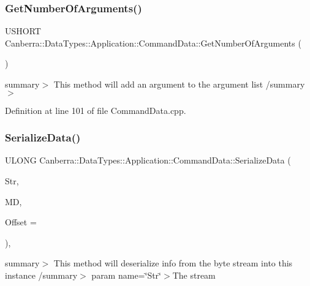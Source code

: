 \subsubsection{\texorpdfstring{Get\+Number\+Of\+Arguments()}{GetNumberOfArguments()}}
{\footnotesize\ttfamily U\+S\+H\+O\+RT Canberra\+::\+Data\+Types\+::\+Application\+::\+Command\+Data\+::\+Get\+Number\+Of\+Arguments (\begin{DoxyParamCaption}{ }\end{DoxyParamCaption})}

summary$>$ This method will add an argument to the argument list /summary$>$ 

Definition at line 101 of file Command\+Data.\+cpp.

\mbox{\label{class_canberra_1_1_data_types_1_1_application_1_1_command_data_a1233e7b3931f58f1fa084bc600907322_a1233e7b3931f58f1fa084bc600907322}} 
\subsubsection{\texorpdfstring{Serialize\+Data()}{SerializeData()}}
{\footnotesize\ttfamily U\+L\+O\+NG Canberra\+::\+Data\+Types\+::\+Application\+::\+Command\+Data\+::\+Serialize\+Data (\begin{DoxyParamCaption}\item[{\hyperlink{class_canberra_1_1_utility_1_1_core_1_1_byte_stream}{Canberra\+::\+Utility\+::\+Core\+::\+Byte\+Stream} \&}]{Str,  }\item[{const \hyperlink{class_canberra_1_1_serialization_1_1_meta_data}{Canberra\+::\+Serialization\+::\+Meta\+Data} \&}]{MD,  }\item[{const L\+O\+NG}]{Offset = {} }\end{DoxyParamCaption})\hspace{0.3cm}{\ttfamily [protected]}, {\ttfamily [virtual]}}

summary$>$ This method will deserialize info from the byte stream into this instance /summary$>$ param name=\char`\"{}\+Str\char`\"{}$>$The stream


